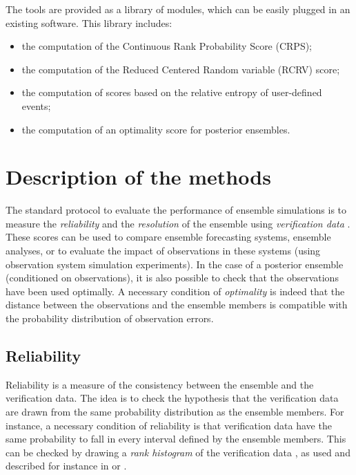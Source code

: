 \documentclass[11pt]{article}
\begin{document}
The tools are provided as a library of modules,
which can be easily plugged in an existing software.
This library includes:

\begin{itemize}
\item the computation of the Continuous Rank Probability Score (CRPS);
\item the computation of the Reduced Centered Random variable (RCRV) score;
\item the computation of scores based on the relative entropy of user-defined events;
\item the computation of an optimality score for posterior ensembles.
\end{itemize}

\clearpage

\pagestyle{plain}

\section{Description of the methods}

The standard protocol to evaluate the performance of ensemble simulations
is to measure the {\em reliability} and the {\em resolution} of the ensemble
using {\em verification data} \citep{TOTH03,CAND05,CAND07}.
These scores can be used to compare ensemble forecasting systems,
ensemble analyses, or to evaluate the impact of observations in these systems
(using observation system simulation experiments).
In the case of a posterior ensemble (conditioned on observations),
it is also possible to check that the observations have been used optimally.
A necessary condition of {\em optimality} is indeed that the distance
between the observations and the ensemble members
is compatible with the probability distribution of observation errors.

\subsection{Reliability}

Reliability is a measure of the consistency between the ensemble and the verification data.
The idea is to check the hypothesis that the verification data
are drawn from the same probability distribution as the ensemble members.
For instance, a necessary condition of reliability is that
verification data have the same probability to fall in every interval
defined by the ensemble members.
This can be checked by drawing a {\em rank histogram} of the verification data \citep{ANDE96},
as used and described for instance in \citet{CAND15} or \citet{GARN16}.
\end{document}
